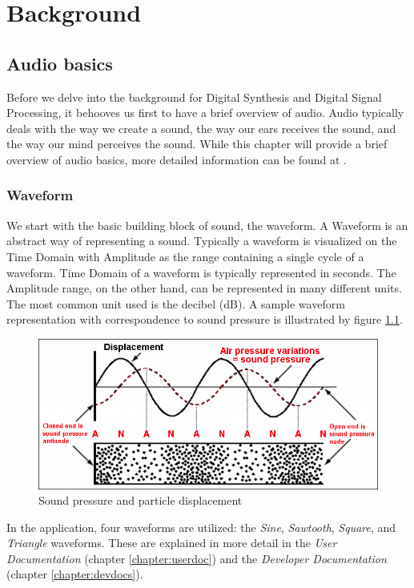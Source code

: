 \documentclass[a4paper,12pt]{report}
\begin{document}
\chapter{Background}
\label{chapter:background}
\section{Audio basics}
\label{sec:audiobasics}
Before we delve into the background for Digital Synthesis and Digital Signal Processing, it behooves us first to have a brief overview of audio. Audio typically deals with the way we create a sound, the way our ears receives the sound, and the way our mind perceives the sound. While this chapter will provide a brief overview of audio basics, more detailed information can be found at \cite{beginneraudiosynthesis}.

\subsection{Waveform}
\label{subsec:waveform}
We start with the basic building block of sound, the waveform. A Waveform is an abstract way of representing a sound. Typically a waveform is visualized on the Time Domain with Amplitude as the range containing a single cycle of a waveform. Time Domain of a waveform is typically represented in seconds. The Amplitude range, on the other hand, can be represented in many different units. The most common unit used is the decibel (dB). A sample waveform representation with correspondence to sound pressure is illustrated by figure \ref{fig:particledisplacementsoundpressure}.

\begin{figure}[h][h]
    \centering
    \includegraphics[width=32em]{ParticleDisplacement-SoundPressure-Node-Antinode.png}
    \caption{Sound pressure and particle displacement}
    \label{fig:particledisplacementsoundpressure}
\end{figure}

In the application, four waveforms are utilized: the \emph{Sine}, \emph{Sawtooth}, \emph{Square}, and \emph{Triangle} waveforms. These are explained in more detail in the \emph{User Documentation} (chapter \ref{chapter:userdoc}) and the \emph{Developer Documentation} (chapter \ref{chapter:devdocs}).
\end{document}

